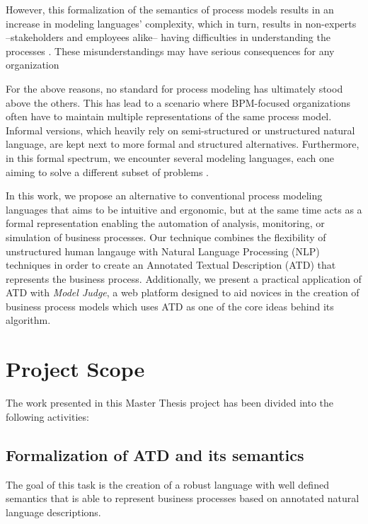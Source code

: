 However, this formalization of the semantics of process models results in an
increase in modeling languages' complexity, which in turn, results in
non-experts --stakeholders and employees alike-- having difficulties in
understanding the processes \cite{leopold2014supporting}. These misunderstandings may
have serious consequences for any organization \cite{van2015fragmentation}

For the above reasons, no standard for process modeling has ultimately stood above
the others. This has lead to a scenario where BPM-focused organizations often
have to maintain multiple representations of the same process model. Informal
versions, which heavily rely on semi-structured or unstructured natural
language, are kept next to more formal and structured alternatives. Furthermore,
in this formal spectrum, we encounter several modeling languages, each one
aiming to solve a different subset of problems \cite{10.1007/978-3-540-72035-5_7,
 van2003workflow}.

In this work, we propose an alternative to conventional process modeling
languages that aims to be intuitive and ergonomic, but at the same time acts 
as a formal representation enabling the automation of analysis, monitoring, or
simulation of business processes. Our technique combines the flexibility of
unstructured human langauge with Natural Language Processing (NLP) techniques in
order to create an Annotated Textual Description (ATD) that represents the
business process. Additionally, we present a practical application of ATD with
\emph{Model Judge}, a web platform designed to aid novices in the creation of
business process models which uses ATD as one of the core ideas behind its
algorithm.

\section{Project Scope}
\label{sec:scope}

The work presented in this Master Thesis project has been divided into the
following activities:

\subsection*{Formalization of ATD and its semantics}

The goal of this task is the creation of a robust language with well defined
semantics that is able to represent business processes based on annotated 
natural language descriptions. 

